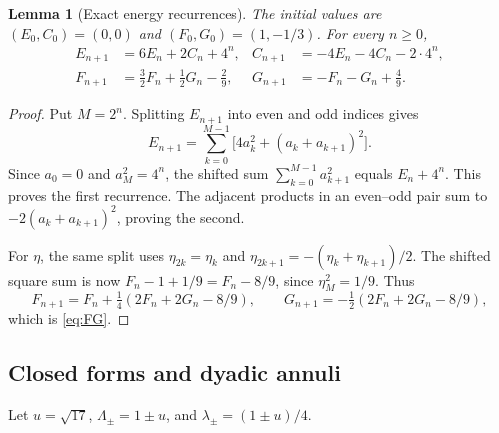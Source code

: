 \documentclass[11pt,a4paper]{article}
\newtheorem{lemma}[theorem]{Lemma}
\theoremstyle{definition}
\theoremstyle{remark}
\numberwithin{equation}{section}
\begin{document}
\begin{lemma}[Exact energy recurrences]
\label{lem:energy-recurrences}
The initial values are $(E_0,C_0)=(0,0)$ and $(F_0,G_0)=(1,-1/3)$.
For every $n\ge0$,
\begin{align}
 E_{n+1}&=6E_n+2C_n+4^n,&
 C_{n+1}&=-4E_n-4C_n-2\cdot4^n,\label{eq:EC}\\
 F_{n+1}&=\tfrac32F_n+\tfrac12G_n-\tfrac29,&
 G_{n+1}&=-F_n-G_n+\tfrac49.\label{eq:FG}
\end{align}
\end{lemma}
\begin{proof}
Put $M=2^n$. Splitting $E_{n+1}$ into even and odd indices gives
\[
 E_{n+1}=\sum_{k=0}^{M-1}\bigl[4a_k^2+(a_k+a_{k+1})^2\bigr].
\]
Since $a_0=0$ and $a_M^2=4^n$, the shifted sum
$\sum_{k=0}^{M-1}a_{k+1}^2$ equals $E_n+4^n$. This proves the first
recurrence. The adjacent products in an even--odd pair sum to
$-2(a_k+a_{k+1})^2$, proving the second.

For $\eta$, the same split uses
$\eta_{2k}=\eta_k$ and
$\eta_{2k+1}=-(\eta_k+\eta_{k+1})/2$. The shifted square sum is now
$F_n-1+1/9=F_n-8/9$, since $\eta_M^2=1/9$.
Thus
\[
 F_{n+1}=F_n+\tfrac14(2F_n+2G_n-8/9),\qquad
 G_{n+1}=-\tfrac12(2F_n+2G_n-8/9),
\]
which is \eqref{eq:FG}.
\end{proof}

\subsection{Closed forms and dyadic annuli}
Let $u=\sqrt{17}$, $\Lambda_\pm=1\pm u$, and
$\lambda_\pm=(1\pm u)/4$.
\end{document}
